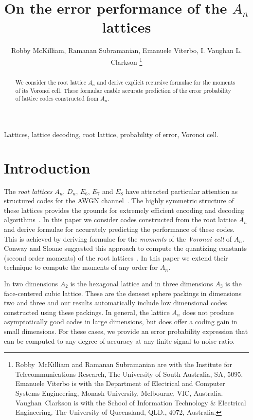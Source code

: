 \documentclass[journal, onecolumn, 11pt]{IEEEtran}
\title{On the error performance of the $A_n$ lattices}
\author{Robby McKilliam, Ramanan Subramanian, Emanuele Viterbo, I. Vaughan L. Clarkson
 \thanks{Robby~McKilliam and Ramanan Subramanian are with the Institute for Telecommunications Research, The University of South Australia, SA, 5095.  Emanuele Viterbo is with the Department of Electrical and Computer Systems Engineering, Monash University, Melbourne, VIC, Australia.   Vaughan~Clarkson is with the School of Information Technology \& Electrical Engineering, The University of Queensland, QLD., 4072, Australia.}
}
\begin{document}
\newcommand{\calR}{\mathcal{R}}
\newcommand{\hist}{\operatorname{hist}}

\maketitle

\begin{abstract}
We consider the root lattice $A_n$ and derive explicit recursive formulae for the moments of its Voronoi cell.  These formulae
enable accurate prediction of the error probability of lattice codes constructed from $A_n$.
\end{abstract}

\begin{IEEEkeywords}
Lattices, lattice decoding, root lattice, probability of error, Voronoi cell.
\end{IEEEkeywords}

\section{Introduction}\label{sec:introduction}


The \emph{root lattices} $A_n$, $D_n$, $E_6$, $E_7$ and $E_8$ have attracted particular attention as structured codes for the AWGN channel~\cite{SPLAG}. The highly symmetric structure of these lattices provides the grounds for extremely efficient encoding and decoding algorithms~\cite{Conway1982FastQuantDec,McKilliam2009CoxeterLattices,McKilliam2008}.  In this paper we consider codes constructed from the root lattice $A_n$ and derive formulae for accurately predicting the performance of these codes.  This is achieved by deriving formulae for the \emph{moments} of the \emph{Voronoi cell} of $A_n$.  Conway and Sloane suggested this approach to compute the quantizing constants (second order moments) of the root lattices~\cite{Conway1982VoronoiRegions}.  In this paper we extend their technique to compute the moments of any order for $A_n$.

In two dimensions $A_2$ is the hexagonal lattice and in three dimensions $A_3$ is the face-centered cubic lattice.  These are the densest sphere packings in dimensions two and three and our results automatically include low dimensional codes constructed using these packings.  In general, the lattice $A_n$ does not produce asymptotically good codes in large dimensions, but does offer a coding gain in small dimensions.  For these cases, we provide an error probability expression that can be computed to any degree of accuracy at any finite signal-to-noise ratio.
\end{document}
